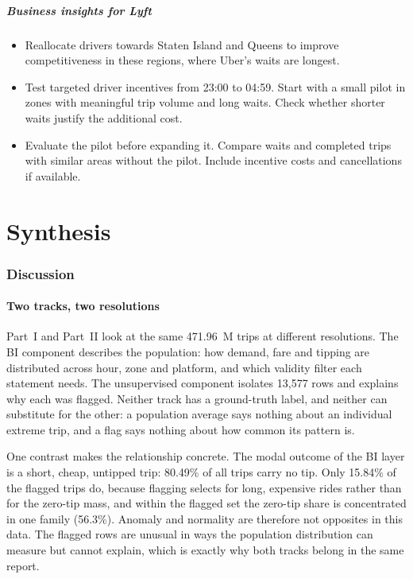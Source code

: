 \documentclass[11pt,a4paper]{article}
\begin{document}
\subsubsection{Business insights for Lyft}

\begin{itemize}
\item Reallocate drivers towards Staten Island and Queens to improve
      competitiveness in these regions, where Uber's waits are longest.
\item Test targeted driver incentives from 23:00 to 04:59. Start with a small
      pilot in zones with meaningful trip volume and long waits. Check whether
      shorter waits justify the additional cost.
\item Evaluate the pilot before expanding it. Compare waits and completed trips
      with similar areas without the pilot. Include incentive costs and
      cancellations if available.
\end{itemize}

\part{Synthesis}

\section{Discussion}
\label{sec:discussion}

\subsection{Two tracks, two resolutions}

Part~I and Part~II look at the same 471.96~M trips at different resolutions. The BI component describes the population: how demand, fare and tipping are distributed across hour, zone and platform, and which validity filter each statement needs. The unsupervised component isolates 13{,}577 rows and explains why each was flagged. Neither track has a ground-truth label, and neither can substitute for the other: a population average says nothing about an individual extreme trip, and a flag says nothing about how common its pattern is.

One contrast makes the relationship concrete. The modal outcome of the BI layer is a short, cheap, untipped trip: 80.49\% of all trips carry no tip. Only 15.84\% of the flagged trips do, because flagging selects for long, expensive rides rather than for the zero-tip mass, and within the flagged set the zero-tip share is concentrated in one family (56.3\%). Anomaly and normality are therefore not opposites in this data. The flagged rows are unusual in ways the population distribution can measure but cannot explain, which is exactly why both tracks belong in the same report.
\end{document}

